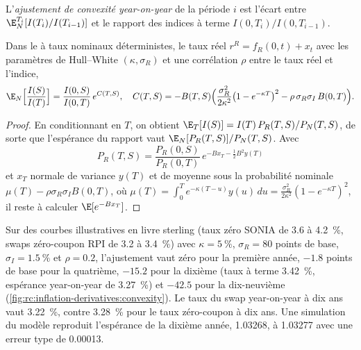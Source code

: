 \begin{definition}\label{def:rc:inflation-derivatives:yoyadj}
L'\emph{ajustement de convexité year-on-year}
de la période $i$ est l'écart entre $\E^{T_i}_N[I(T_i)/I(T_{i-1})]$ et le rapport des
indices à terme $I(0,T_i)/I(0,T_{i-1})$.
\end{definition}

\begin{proposition}\label{prop:rc:inflation-derivatives:yoy}
Dans le  à taux nominaux déterministes, le taux réel
$r^R = f_R(0,t)+x_t$ avec les paramètres de Hull--White $(\kappa,\sigma_R)$ et une corrélation $\rho$
entre le taux réel et l'indice,
\[
\E_N\Bigl[\frac{I(S)}{I(T)}\Bigr] = \frac{I(0,S)}{I(0,T)}\,e^{C(T,S)},\quad
C(T,S) = -B(T,S)\Bigl(\frac{\sigma_R^2}{2\kappa^2}\bigl(1-e^{-\kappa T}\bigr)^2-\rho\,\sigma_R\sigma_I\,B(0,T)\Bigr).
\]
\end{proposition}
\begin{proof}
En conditionnant en $T$, on obtient $\E_T[I(S)] = I(T)\,P_R(T,S)/P_N(T,S)$, de sorte que
l'espérance du rapport vaut $\E_N[P_R(T,S)]/P_N(T,S)$. Avec
\[
P_R(T,S) = \frac{P_R(0,S)}{P_R(0,T)}\,e^{-Bx_T-\frac12B^2y(T)}
\]
et $x_T$ normale de variance $y(T)$ et de moyenne sous la probabilité nominale $\mu(T)-\rho\sigma_R\sigma_IB(0,T)$,
où $\mu(T) = \int_0^Te^{-\kappa(T-u)}y(u)\,du = \frac{\sigma_R^2}{2\kappa^2}(1-e^{-\kappa T})^2$, il reste à calculer
$\E[e^{-Bx_T}]$.
\end{proof}

\label{lst:rc:inflation-derivatives:yoy}

\begin{example}\label{ex:rc:inflation-derivatives:conv}
Sur des courbes illustratives en livre sterling (taux zéro SONIA de 3.6 à 4.2~\%, swaps zéro-coupon RPI
de 3.2 à 3.4~\%) avec $\kappa=5~\%$, $\sigma_R=80$ points de base, $\sigma_I=1.5~\%$ et
$\rho=0.2$, l'ajustement vaut zéro pour la première année, $-1.8$ points de base pour la quatrième,
$-15.2$ pour la dixième (taux à terme 3.42~\%, espérance year-on-year de 3.27~\%) et $-42.5$ pour la
dix-neuvième (\cref{fig:rc:inflation-derivatives:convexity}). Le taux du swap year-on-year à dix ans
vaut 3.22~\%, contre 3.28~\% pour le taux zéro-coupon à dix ans. Une simulation du modèle
reproduit l'espérance de la dixième année, 1.03268, à 1.03277 avec une erreur type de
0.00013.
\end{example}

